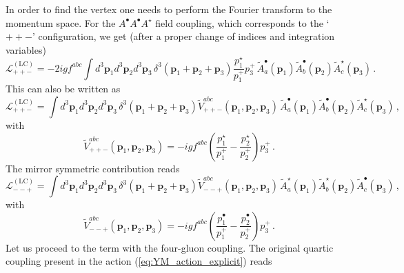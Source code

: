 \documentclass[english,american]{article}
\begin{document}
In order to find the vertex one needs to perform the Fourier transform to the momentum space. For the $A^{\bullet}A^{\bullet}A^{\star}$
field coupling, which corresponds to the `$++-$' configuration, we get (after a proper change of indices and integration
variables)
\begin{equation}
\mathcal{L}_{++-}^{\left(\mathrm{LC}\right)}=-2igf^{abc}\int d^{3}\mathbf{p}_{1}d^{3}\mathbf{p}_{2}d^{3}\mathbf{p}_{3}\,\delta^{3}\left(\mathbf{p}_{1}+\mathbf{p}_{2}+\mathbf{p}_{3}\right)\frac{p_{1}^{\star}}{p_{1}^{+}}p_{3}^{+}\,\tilde{A}_{a}^{\bullet}\left(\mathbf{p}_{1}\right)\tilde{A}_{b}^{\bullet}\left(\mathbf{p}_{2}\right)\tilde{A}_{c}^{\star}\left(\mathbf{p}_{3}\right)\,.
\end{equation}
This can also be written as
\begin{equation}
\mathcal{L}_{++-}^{\left(\mathrm{LC}\right)}=\int d^{3}\mathbf{p}_{1}d^{3}\mathbf{p}_{2}d^{3}\mathbf{p}_{3}\,\delta^{3}\left(\mathbf{p}_{1}+\mathbf{p}_{2}+\mathbf{p}_{3}\right)\tilde{V}_{++-}^{abc}\left(\mathbf{p}_{1},\mathbf{p}_{2},\mathbf{p}_{3}\right)\,\tilde{A}_{a}^{\bullet}\left(\mathbf{p}_{1}\right)\tilde{A}_{b}^{\bullet}\left(\mathbf{p}_{2}\right)\tilde{A}_{c}^{\star}\left(\mathbf{p}_{3}\right)\,,
\end{equation}
with
\begin{equation}
\tilde{V}_{++-}^{abc}\left(\mathbf{p}_{1},\mathbf{p}_{2},\mathbf{p}_{3}\right)=-igf^{abc}\left(\frac{p_{1}^{\star}}{p_{1}^{+}}-\frac{p_{2}^{\star}}{p_{2}^{+}}\right)p_{3}^{+}\,.
\end{equation}
The mirror symmetric contribution reads
\begin{equation}
\mathcal{L}_{--+}^{\left(\mathrm{LC}\right)}=\int d^{3}\mathbf{p}_{1}d^{3}\mathbf{p}_{2}d^{3}\mathbf{p}_{3}\,\delta^{3}\left(\mathbf{p}_{1}+\mathbf{p}_{2}+\mathbf{p}_{3}\right)\tilde{V}_{--+}^{abc}\left(\mathbf{p}_{1},\mathbf{p}_{2},\mathbf{p}_{3}\right)\,\tilde{A}_{a}^{\star}\left(\mathbf{p}_{1}\right)\tilde{A}_{b}^{\star}\left(\mathbf{p}_{2}\right)\tilde{A}_{c}^{\bullet}\left(\mathbf{p}_{3}\right)\,,
\end{equation}
with
\begin{equation}
\tilde{V}_{--+}^{abc}\left(\mathbf{p}_{1},\mathbf{p}_{2},\mathbf{p}_{3}\right)=-igf^{abc}\left(\frac{p_{1}^{\bullet}}{p_{1}^{+}}-\frac{p_{2}^{\bullet}}{p_{2}^{+}}\right)p_{3}^{+}\,.\label{eq:App_vertex3g}
\end{equation}
Let us proceed to the term with the four-gluon coupling. The original quartic coupling
present in the action (\ref{eq:YM_action_explicit}) reads
\end{document}
